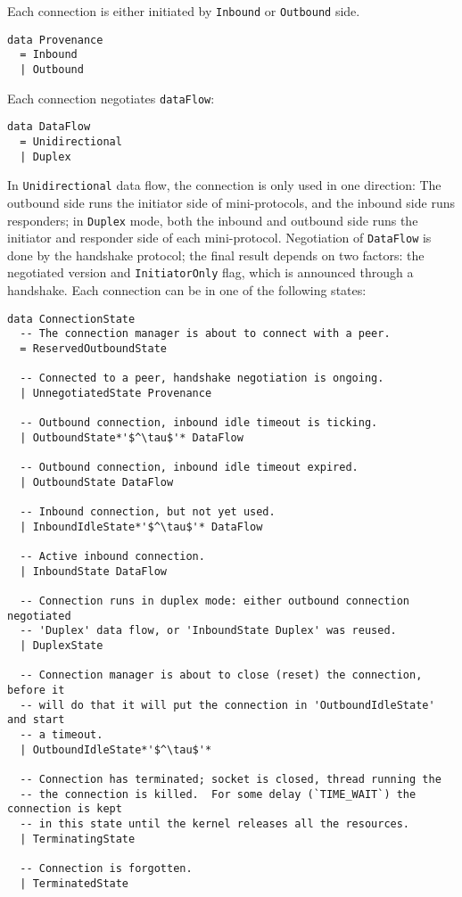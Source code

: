 Each connection is either initiated by \texttt{Inbound} or \texttt{Outbound} side.

\begin{lstlisting}
data Provenance
  = Inbound
  | Outbound
\end{lstlisting}
Each connection negotiates \texttt{dataFlow}:
\begin{lstlisting}
data DataFlow
  = Unidirectional
  | Duplex
\end{lstlisting}

In \texttt{Unidirectional} data flow, the connection is only used in one direction:
The outbound side runs the initiator side of mini-protocols, and the inbound side runs
responders; in \texttt{Duplex} mode, both the inbound and outbound side runs
the initiator and responder side of each mini-protocol. Negotiation of
\texttt{DataFlow} is done by the handshake protocol; the final result depends
on two factors: the negotiated version and \texttt{InitiatorOnly} flag, which is
announced through a handshake. Each connection can be in one of the following states:

\begin{lstlisting}
data ConnectionState
  -- The connection manager is about to connect with a peer.
  = ReservedOutboundState

  -- Connected to a peer, handshake negotiation is ongoing.
  | UnnegotiatedState Provenance

  -- Outbound connection, inbound idle timeout is ticking.
  | OutboundState*'$^\tau$'* DataFlow

  -- Outbound connection, inbound idle timeout expired.
  | OutboundState DataFlow

  -- Inbound connection, but not yet used.
  | InboundIdleState*'$^\tau$'* DataFlow

  -- Active inbound connection.
  | InboundState DataFlow

  -- Connection runs in duplex mode: either outbound connection negotiated
  -- 'Duplex' data flow, or 'InboundState Duplex' was reused.
  | DuplexState

  -- Connection manager is about to close (reset) the connection, before it
  -- will do that it will put the connection in 'OutboundIdleState' and start
  -- a timeout.
  | OutboundIdleState*'$^\tau$'*

  -- Connection has terminated; socket is closed, thread running the
  -- the connection is killed.  For some delay (`TIME_WAIT`) the connection is kept
  -- in this state until the kernel releases all the resources.
  | TerminatingState

  -- Connection is forgotten.
  | TerminatedState
\end{lstlisting}

